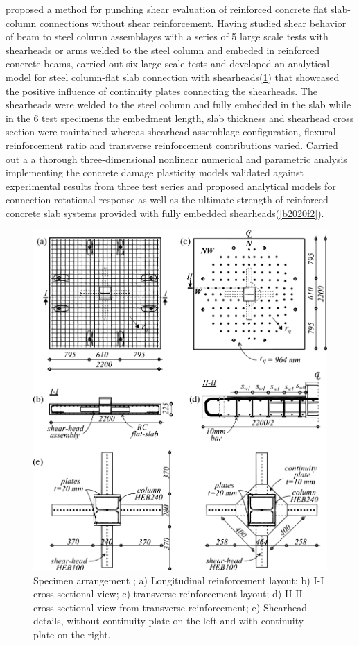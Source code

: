 \cite{bompa2015} proposed a method for punching shear evaluation of reinforced concrete flat slab-column connections without shear reinforcement. Having studied shear behavior of beam to steel column assemblages\citep{bompa2016b} with a series of 5 large scale tests with shearheads or arms welded to the steel column and embeded in reinforced concrete beams, \cite{Bompa2016a} carried out six large scale tests and developed an analytical model for steel column-flat slab connection with shearheads(\ref{bf2}) that showcased the positive influence of continuity plates connecting the shearheads. The shearheads were welded to the steel column and fully embedded in the slab while in the 6 test specimens the embedment length, slab thickness and shearhead cross section were maintained whereas shearhead assemblage configuration, flexural reinforcement ratio and transverse reinforcement contributions varied. \cite{bompa2020} Carried out a a thorough three-dimensional nonlinear numerical and parametric analysis implementing the concrete damage plasticity models validated against experimental results from three test series\citep{guandalini2009punching,chana1996,hawkins1974} and proposed analytical models for connection rotational response as well as the ultimate strength of reinforced concrete slab systems provided with fully embedded shearheads(\ref{b2020f2}). 
\begin{figure}\centering
    \includegraphics[width=\columnwidth]{Figures/bf2.pdf}
    \caption{Specimen arrangement \cite{Bompa2016a}; a) Longitudinal reinforcement layout; b) I-I cross-sectional view; c) transverse reinforcement layout; d) II-II cross-sectional view from transverse reinforcement; e) Shearhead details, without continuity plate on the left and with continuity plate on the right.}
    \label{bf2}
    \end{figure}
